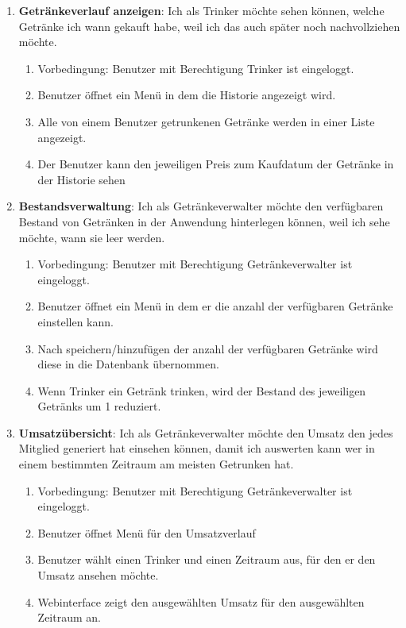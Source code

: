 \documentclass[conference,a4paper]{cs-techrep}
\begin{document}
\begin{enumerate}[{USS}1]

\item \textbf{Getränkeverlauf anzeigen}: Ich als Trinker möchte sehen können, welche Getränke ich wann gekauft habe, weil ich das auch später noch nachvollziehen möchte.
\begin{enumerate}
	\item Vorbedingung: Benutzer mit Berechtigung Trinker ist eingeloggt.
	\item Benutzer öffnet ein Menü in dem die Historie angezeigt wird.
	\item Alle von einem Benutzer getrunkenen Getränke werden in einer Liste angezeigt.
	\item Der Benutzer kann den jeweiligen Preis zum Kaufdatum der Getränke in der Historie sehen
\end{enumerate}

\item \textbf{Bestandsverwaltung}: Ich als Getränkeverwalter möchte den verfügbaren Bestand von Getränken in der Anwendung hinterlegen können, weil ich sehe möchte, wann sie leer werden.
\begin{enumerate}
	\item Vorbedingung: Benutzer mit Berechtigung Getränkeverwalter ist eingeloggt.
	\item Benutzer öffnet ein Menü in dem er die anzahl der verfügbaren Getränke einstellen kann.
	\item Nach speichern/hinzufügen der anzahl der verfügbaren Getränke wird diese in die Datenbank übernommen.
	\item Wenn Trinker ein Getränk trinken, wird der Bestand des jeweiligen Getränks um 1 reduziert.
\end{enumerate}

\item \textbf{Umsatzübersicht}: Ich als Getränkeverwalter möchte den Umsatz den jedes Mitglied generiert hat einsehen können, damit ich auswerten kann wer in einem bestimmten Zeitraum am meisten Getrunken hat.
\begin{enumerate}
	\item Vorbedingung: Benutzer mit Berechtigung Getränkeverwalter ist eingeloggt.
	\item Benutzer öffnet Menü für den Umsatzverlauf
	\item Benutzer wählt einen Trinker und einen Zeitraum aus, für den er den Umsatz ansehen möchte.
	\item Webinterface zeigt den ausgewählten Umsatz für den ausgewählten Zeitraum an.
\end{enumerate}

\end{enumerate}
\end{document}
